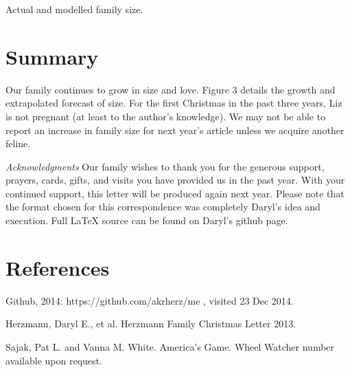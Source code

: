 \documentclass{article}
\makeatletter
\def\refer{\par\noindent\hangindent\parindent\hangafter1}
\newenvironment{figurehere}
  {\def\@captype{figure}}
  {}
\makeatother
\begin{document}
\begin{multicols}{2}
\begin{figurehere}
 \centering   
 \caption{Actual and modelled family size.}
\end{figurehere}

\section{Summary}

Our family continues to grow in size and love. Figure 3 details the growth and
extrapolated forecast of size.  For the first Christmas in
the past three years, Liz is not pregnant (at least to the author's knowledge).  
We may not be able to report
an increase in family size for next year's article unless we acquire another
feline.

\bigskip
  \emph{Acknowledgments} Our family wishes to thank you for the generous 
support, prayers, cards, gifts, and visits you have provided us in the past
year. With your continued support, this letter will be produced again
next year. Please note that the format chosen for this correspondence was
completely Daryl's idea and execution. Full \LaTeX\xspace source can be found on 
Daryl's github page.

\section{References}

\refer Github, 2014: https://github.com/akrherz/me , visited 23 Dec 2014.
\refer Herzmann, Daryl E., et al. Herzmann Family Christmas Letter 2013. 
\refer Sajak, Pat L. and Vanna M. White. America's Game. Wheel Watcher number 
available upon request. 

\end{multicols}
\end{document}
